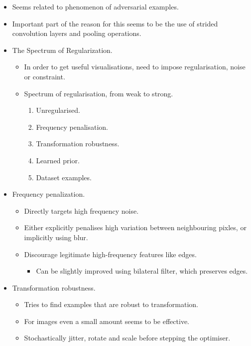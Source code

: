 \begin{itemize}
\begin{itemize}
        \item Seems related to phenomenon of adversarial examples.
        \item Important part of the reason for this seems to be the use of strided convolution layers and pooling operations.
        \item The Spectrum of Regularization.
        \begin{itemize}
            \item In order to get useful visualisations, need to impose regularisation, noise or constraint.
            \item Spectrum of regularisation, from weak to strong.
            \begin{enumerate}[label=(\roman*)]
                \item Unregularised.
                \item Frequency penalisation.
                \item Transformation robustness.
                \item Learned prior.
                \item Dataset examples.
            \end{enumerate}
        \end{itemize}
        \item Frequency penalization.
        \begin{itemize}
            \item Directly targets high frequency noise.
            \item Either explicitly penalises high variation between neighbouring pixles, or implicitly using blur.
            \item Discourage legitimate high-frequency features like edges.
            \begin{itemize}
                \item Can be slightly improved using bilateral filter, which preserves edges.
            \end{itemize}
        \end{itemize}
        \item Transformation robustness.
        \begin{itemize}
            \item Tries to find examples that are robust to transformation.
            \item For images even a small amount seems to be effective.
            \item Stochastically jitter, rotate and scale before stepping the optimiser.

\end{itemize}
\end{itemize}
\end{itemize}

